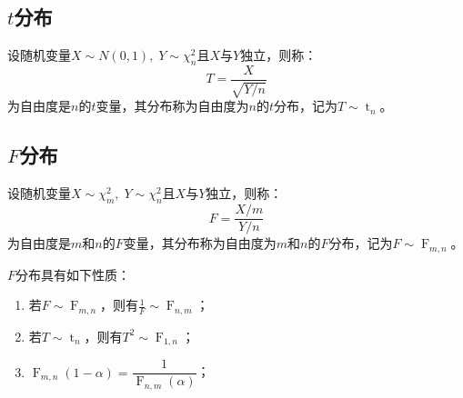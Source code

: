 \subsection{$t$分布}
\begin{definition}
	设随机变量$X\sim N(0,1),\;Y\sim\chi_n^2$且$X$与$Y$独立，则称：
	\begin{equation*}
		T=\frac{X}{\sqrt{Y/ n}}
	\end{equation*}
	为自由度是$n$的$t$变量，其分布称为自由度为$n$的$t$分布，记为$T\sim \operatorname{t}_n$。
\end{definition}

\subsection{$F$分布}
\begin{definition}
	设随机变量$X\sim \chi_m^2,\;Y\sim\chi_n^2$且$X$与$Y$独立，则称：
	\begin{equation*}
		F=\frac{X/m}{Y/n}
	\end{equation*}
	为自由度是$m$和$n$的$F$变量，其分布称为自由度为$m$和$n$的$F$分布，记为$F\sim \operatorname{F}_{m,n}$。
\end{definition}
\begin{property}\label{prop:FDistribution}
	$F$分布具有如下性质：
	\begin{enumerate}
		\item 若$F\sim \operatorname{F}_{m,n}$，则有$\frac{1}{F}\sim \operatorname{F}_{n,m}$；
		\item 若$T\sim \operatorname{t}_n$，则有$T^2\sim \operatorname{F}_{1,n}$；
		\item $\operatorname{F}_{m,n}(1-\alpha)=\dfrac{1}{\operatorname{F}_{n,m}(\alpha)}$；
	\end{enumerate}
\end{property}

